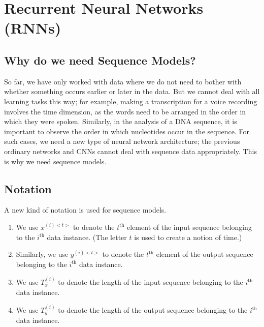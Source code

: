 \documentclass[a4paper, 12pt]{report}
\begin{document}
\chapter{Recurrent Neural Networks (RNNs)}

\section{Why do we need Sequence Models?}
So far, we have only worked with data where we do not need to bother with whether something occurs earlier or later in the data. But we cannot deal with all learning tasks this way; for example, making a transcription for a voice recording involves the time dimension, as the words need to be arranged in the order in which they were spoken. Similarly, in the analysis of a DNA sequence, it is important to observe the order in which nucleotides occur in the sequence. For such cases, we need a new type of neural network architecture; the previous ordinary networks and CNNs cannot deal with sequence data appropriately. This is why we need sequence models.

\section{Notation}
A new kind of notation is used for sequence models.
\begin{enumerate}
\item We use $x^{(i)<t>}$ to denote the $t^{\text{th}}$ element of the input sequence belonging to the $i^{\text{th}}$ data instance. (The letter $t$ is used to create a notion of time.)
\item Similarly, we use $y^{(i)<t>}$ to denote the $t^{\text{th}}$ element of the output sequence belonging to the $i^{\text{th}}$ data instance.
\item We use $T_{x}^{(i)}$ to denote the length of the input sequence belonging to the $i^{\text{th}}$ data instance.
\item We use $T_{y}^{(i)}$ to denote the length of the output sequence belonging to the $i^{\text{th}}$ data instance.
\end{enumerate}
\end{document}

